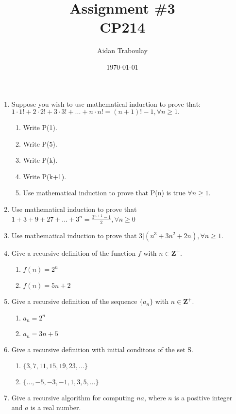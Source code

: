 \documentclass[12pt]{article}
\title{Assignment \#3\\
        \large{CP214}
      }
\author{Aidan Traboulay}
\date{\today}
\begin{document}
\maketitle
\begin{enumerate}[leftmargin=\labelsep]

\item Suppose you wish to use mathematical induction to prove that: $ 1 \cdot 1! + 2 \cdot 2! + 3 \cdot 3! + ... + n \cdot n! = (n + 1)! - 1, \forall n \geq 1. $
    \begin{enumerate}
        \item Write P(1).
        \item Write P(5).
        \item Write P(k).
        \item Write P(k+1).
        \item Use mathematical induction to prove that P(n) is true $ \forall n \geq 1 $.
    \end{enumerate}

\item Use mathematical induction to prove that $ 1 + 3 + 9 + 27 + ... + 3^n = \frac{3^{n+1}-1}{2}, \forall n \geq 0 $

\item Use mathematical induction to prove that $3 \vert (n^3 + 3n^2 + 2n), \forall n \geq 1.$

\item Give a recursive definition of the function $ f $ with $ n \in \textbf{Z}^+. $
    \begin{enumerate}
        \item $ f(n) = 2^n $
        \item $ f(n) = 5n + 2 $ 
    \end{enumerate}

\item Give a recursive definition of the sequence $ \{a_n\} $ with $ n \in \textbf{Z}^+. $
    \begin{enumerate}
        \item $ a_n = 2^n $
        \item $ a_n = 3n + 5 $
    \end{enumerate}

\item Give a recursive definition with initial conditons of the set S.
    \begin{enumerate}
        \item $ \{3,7,11,15,19,23,...\} $
        \item $ \{...,-5,-3,-1,1,3,5,...\} $
    \end{enumerate}

\item Give a recursive algorithm for computing $na$, where $n$ is a positive integer and $a$ is a real number.
    
\end{enumerate}
\end{document}
